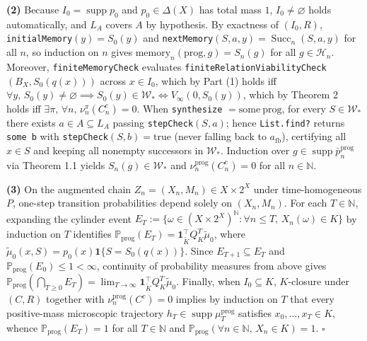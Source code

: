 \documentclass[11pt,a4paper]{article}
\newcounter{none}
\begin{document}
\textbf{(2)} Because \(I_0 = \operatorname{supp} p_0\) and
\(p_0 \in \Delta(X)\) has total mass \(1\), \(I_0 \neq \varnothing\)
holds automatically, and \(L_A\) covers \(A\) by hypothesis. By
exactness of \((I_0, R)\), \texttt{initialMemory}\((y) = S_0(y)\) and
\texttt{nextMemory}\((S, a, y) = \operatorname{Succ}_n(S, a, y)\) for
all \(n\), so induction on \(n\) gives
\(\mathrm{memory}_n(\mathrm{prog}, g) = S_n(g)\) for all
\(g \in \mathcal{H}_n\). Moreover, \texttt{finiteMemoryCheck} evaluates
\texttt{finiteRelationViabilityCheck}\((B_X, S_0(q(x)))\) across
\(x \in I_0\), which by Part (1) holds iff
\(\forall y,\, S_0(y) \neq \varnothing \implies S_0(y) \in \mathcal{W}_* \iff V_\infty(0, S_0(y))\),
which by Theorem 2 holds iff
\(\exists \pi,\, \forall n,\, \nu_n^\pi(C_n^c) = 0\). When
\texttt{synthesize} \(= \mathrm{some\ prog}\), for every
\(S \in \mathcal{W}_*\) there exists \(a \in A \subseteq L_A\) passing
\texttt{stepCheck}\((S, a)\); hence \texttt{List.find?} returns
\texttt{some\ b} with \texttt{stepCheck}\((S, b) = \mathrm{true}\)
(never falling back to \(a_{\mathrm{fb}}\)), certifying all \(x \in S\)
and keeping all nonempty successors in \(\mathcal{W}_*\). Induction over
\(g \in \operatorname{supp}\bar{p}_n^{\mathrm{prog}}\) via Theorem 1.1
yields \(S_n(g) \in \mathcal{W}_*\) and
\(\nu_n^{\mathrm{prog}}(C_n^c) = 0\) for all \(n \in \mathbb{N}\).

\textbf{(3)} On the augmented chain
\(Z_n = (X_n, M_n) \in X \times 2^X\) under time-homogeneous \(P\),
one-step transition probabilities depend solely on \((X_n, M_n)\). For
each \(T \in \mathbb{N}\), expanding the cylinder event
\(E_T := \{\omega \in (X \times 2^X)^{\mathbb{N}} : \forall n \le T,\, X_n(\omega) \in K\}\)
by induction on \(T\) identifies
\(\mathbb{P}_{\mathrm{prog}}(E_T) = \mathbf{1}_{\widetilde{K}}^\top Q_K^T \widetilde{\mu}_0\),
where \(\widetilde{\mu}_0(x, S) = p_0(x)\mathbf{1}\{S = S_0(q(x))\}\).
Since \(E_{T+1} \subseteq E_T\) and
\(\mathbb{P}_{\mathrm{prog}}(E_0) \le 1 < \infty\), continuity of
probability measures from above \citep{kallenberg2021} gives
\(\mathbb{P}_{\mathrm{prog}}(\bigcap_{T \ge 0} E_T) = \lim_{T \to \infty} \mathbf{1}_{\widetilde{K}}^\top Q_K^T \widetilde{\mu}_0\).
Finally, when \(I_0 \subseteq K\), \(K\)-closure under \((C, R)\)
together with \(\nu_n^{\mathrm{prog}}(C^c) = 0\) implies by induction on
\(T\) that every positive-mass microscopic trajectory
\(h_T \in \operatorname{supp}\mu_T^{\mathrm{prog}}\) satisfies
\(x_0, \dots, x_T \in K\), whence
\(\mathbb{P}_{\mathrm{prog}}(E_T) = 1\) for all \(T \in \mathbb{N}\) and
\(\mathbb{P}_{\mathrm{prog}}(\forall n \in \mathbb{N},\, X_n \in K) = 1\).
\(\square\)
\end{document}
